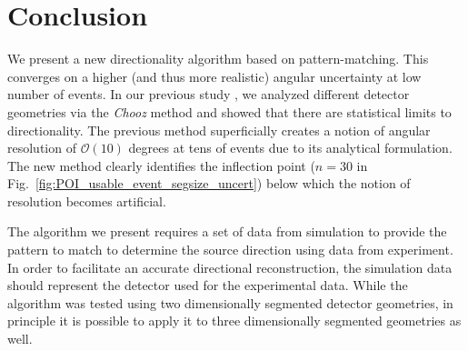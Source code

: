 \documentclass[tightenlines,
twocolumn,prl,notitlepage,nofootinbib,preprintnumbers,longbibliography]{revtex4-1}
\begin{document}



\section{Conclusion}

We present a new directionality algorithm based on pattern-matching. This converges on a higher (and thus more realistic) angular uncertainty at low number of events. 
In our previous study \cite{Duvall:2024cae}, we analyzed different detector geometries via the \textit{Chooz} method and showed that there are statistical limits to directionality. 
The previous method superficially creates a notion of angular resolution of $\mathcal{O}(10)$ degrees at tens of events due to its analytical formulation.
The new method clearly identifies the inflection point ($n=30$ in Fig.~\ref{fig:POI_usable_event_segsize_uncert}) below which the notion of resolution becomes artificial. 

The algorithm we present requires a set of data from simulation to provide the pattern to match to determine the source direction using data from experiment. In order to facilitate an accurate directional reconstruction, the simulation data should represent  the detector used for the experimental data. While the algorithm was tested using two dimensionally segmented detector geometries, in principle it is possible to apply it to three dimensionally segmented geometries as well.
\end{document}
